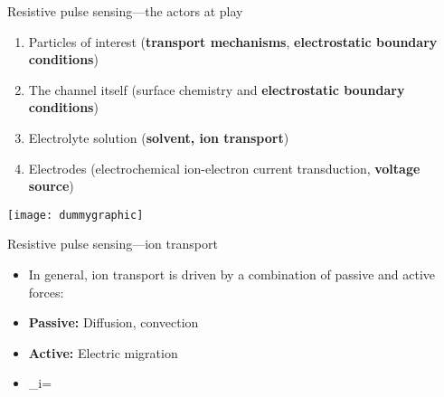 

\begin{frame}[c]{Resistive pulse sensing---the actors at play}
	\begin{enumerate}
		\item Particles of interest (\textbf{\textcolor{positivegreen}{transport mechanisms}}, \textbf{\textcolor{electricyellow}{electrostatic boundary conditions}})
		\item The channel itself (surface chemistry and \textbf{\textcolor{electricyellow}{electrostatic boundary conditions}})
		\item Electrolyte solution (\textbf{\textcolor{waterblue}{solvent, ion transport}})
		\item Electrodes (electrochemical ion-electron current transduction, \textbf{\textcolor{electricyellow}{voltage source}})
	\end{enumerate}
	
	\texttt{[image: dummygraphic]}
	
\end{frame}




\begin{frame}[c]{Resistive pulse sensing---ion transport}
	\begin{itemize}
		\item In general, ion transport is driven by a combination of passive and active forces:
		\item \textbf{Passive:} Diffusion, convection
		\item \textbf{Active:} Electric migration
		\item {}_{i}=
	\end{itemize}
\end{frame}

